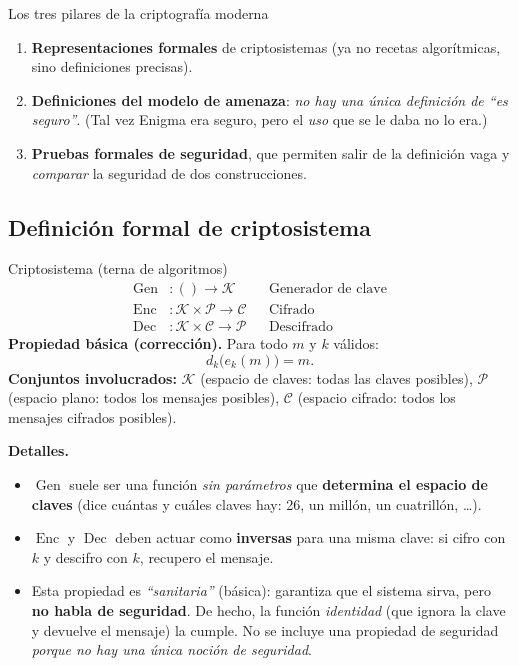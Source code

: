\documentclass[11pt,a4paper]{article}
\newcommand{\Pset}{\mathcal{P}}
\newcommand{\Cset}{\mathcal{C}}
\newcommand{\Kset}{\mathcal{K}}
\DeclareMathOperator{\Enc}{Enc}
\DeclareMathOperator{\Dec}{Dec}
\DeclareMathOperator{\Gen}{Gen}
\begin{document}
\begin{defbox}{Los tres pilares de la criptografía moderna}
\begin{enumerate}[leftmargin=1.6em,itemsep=2pt]
  \item \textbf{Representaciones formales} de criptosistemas (ya no recetas algorítmicas, sino
        definiciones precisas).
  \item \textbf{Definiciones del modelo de amenaza}: \emph{no hay una única definición de ``es
        seguro''}. (Tal vez Enigma era seguro, pero el \emph{uso} que se le daba no lo era.)
  \item \textbf{Pruebas formales de seguridad}, que permiten salir de la definición vaga y
        \emph{comparar} la seguridad de dos construcciones.
\end{enumerate}
\end{defbox}

\subsection{Definición formal de criptosistema}
\begin{defbox}{Criptosistema (terna de algoritmos)}
\[
\begin{aligned}
  \Gen&: () \to \Kset && \text{Generador de clave}\\
  \Enc&: \Kset \times \Pset \to \Cset && \text{Cifrado}\\
  \Dec&: \Kset \times \Cset \to \Pset && \text{Descifrado}
\end{aligned}
\]
\textbf{Propiedad básica (corrección).} Para todo $m$ y $k$ válidos:
\[
  d_k\bigl(e_k(m)\bigr) = m .
\]
\textbf{Conjuntos involucrados:} $\Kset$ (espacio de claves: todas las claves posibles),
$\Pset$ (espacio plano: todos los mensajes posibles), $\Cset$ (espacio cifrado: todos los
mensajes cifrados posibles).
\end{defbox}

\begin{notebox}
\textbf{Detalles.}
\begin{itemize}[leftmargin=1.3em,itemsep=1pt]
  \item $\Gen$ suele ser una función \emph{sin parámetros} que \textbf{determina el espacio de
        claves} (dice cuántas y cuáles claves hay: 26, un millón, un cuatrillón, \dots).
  \item $\Enc$ y $\Dec$ deben actuar como \textbf{inversas} para una misma clave: si cifro con
        $k$ y descifro con $k$, recupero el mensaje.
  \item Esta propiedad es \emph{``sanitaria''} (básica): garantiza que el sistema sirva, pero
        \textbf{no habla de seguridad}. De hecho, la función \emph{identidad} (que ignora la
        clave y devuelve el mensaje) la cumple. No se incluye una propiedad de seguridad
        \emph{porque no hay una única noción de seguridad}.
\end{itemize}
\end{notebox}
\end{document}
